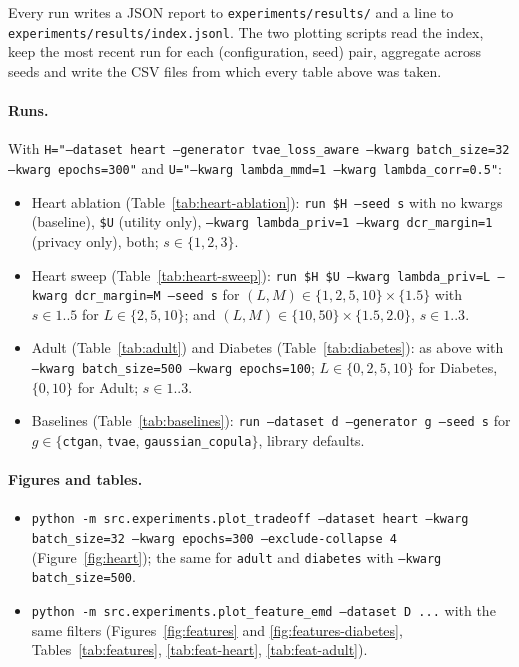 \documentclass[11pt,a4paper]{article}
\begin{document}
Every run writes a JSON report to \texttt{experiments/results/} and a line to
\texttt{experiments/results/index.jsonl}. The two plotting scripts read the
index, keep the most recent run for each (configuration, seed) pair, aggregate
across seeds and write the CSV files from which every table above was taken.

\paragraph{Runs.} With
\texttt{H="--dataset heart --generator tvae\_loss\_aware --kwarg batch\_size=32 --kwarg epochs=300"}
and
\texttt{U="--kwarg lambda\_mmd=1 --kwarg lambda\_corr=0.5"}:

\begin{itemize}[nosep]\small
  \item Heart ablation (Table~\ref{tab:heart-ablation}): \texttt{run \$H --seed s} with no kwargs (baseline), \texttt{\$U} (utility only), \texttt{--kwarg lambda\_priv=1 --kwarg dcr\_margin=1} (privacy only), both; $s \in \{1,2,3\}$.
  \item Heart sweep (Table~\ref{tab:heart-sweep}): \texttt{run \$H \$U --kwarg lambda\_priv=L --kwarg dcr\_margin=M --seed s} for $(L, M) \in \{1,2,5,10\} \times \{1.5\}$ with $s \in 1..5$ for $L \in \{2,5,10\}$; and $(L,M) \in \{10, 50\} \times \{1.5, 2.0\}$, $s \in 1..3$.
  \item Adult (Table~\ref{tab:adult}) and Diabetes (Table~\ref{tab:diabetes}): as above with \texttt{--kwarg batch\_size=500 --kwarg epochs=100}; $L \in \{0, 2, 5, 10\}$ for Diabetes, $\{0, 10\}$ for Adult; $s \in 1..3$.
  \item Baselines (Table~\ref{tab:baselines}): \texttt{run --dataset d --generator g --seed s} for $g \in \{$\texttt{ctgan}, \texttt{tvae}, \texttt{gaussian\_copula}$\}$, library defaults.
\end{itemize}

\paragraph{Figures and tables.}
\begin{itemize}[nosep]\small
  \item \texttt{python -m src.experiments.plot\_tradeoff --dataset heart --kwarg batch\_size=32 --kwarg epochs=300 --exclude-collapse 4} (Figure~\ref{fig:heart}); the same for \texttt{adult} and \texttt{diabetes} with \texttt{--kwarg batch\_size=500}.
  \item \texttt{python -m src.experiments.plot\_feature\_emd --dataset D ...} with the same filters (Figures~\ref{fig:features} and \ref{fig:features-diabetes}, Tables~\ref{tab:features}, \ref{tab:feat-heart}, \ref{tab:feat-adult}).
\end{itemize}
\end{document}
